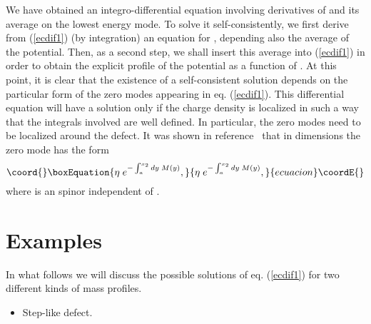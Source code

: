 \documentclass[a4paper,12pt]{article}
\begin{document}
{{We have obtained an integro-differential equation involving
derivatives of \coordHE{} and its average on the lowest energy mode. To solve
it self-consistently, we first derive from (\ref{ecdif1}) (by
integration) an equation for \coordHE{}, depending also the average of the
potential. Then, as a second step, we shall insert this average into
(\ref{ecdif1}) in order to obtain the explicit profile of the
potential as a function of \coordHE{}.  At this point, it is clear that the
existence of a self-consistent solution depends on the particular form
of the zero modes appearing in eq.  (\ref{ecdif1}). This differential
equation will have a solution only if the charge density is localized
in such a way that the integrals involved are well defined. In
particular, the zero modes need to be localized around the defect.  It
was shown in reference~\cite{ch} that in \coordHE{} dimensions the zero
mode has the form
\begin{equation}\coord{}\boxEquation{
\eta\;e^{-\int_a^{x_2}dy\;M(y)},\label{kallan}
}{
\eta\;e^{-\int_a^{x_2}dy\;M(y)},}{ecuacion}\coordE{}\end{equation}
where \myHighlight{$\eta$}\coordHE{} is an spinor independent of \coordHE{}.
\section{Examples}\label{examples}
In what follows we will discuss the possible solutions of eq.
(\ref{ecdif1}) for two different kinds of mass profiles.
\begin{itemize}
\item Step-like defect.
 

\end{itemize}}}
\end{document}
